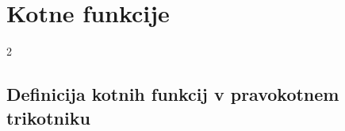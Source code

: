 \section{Kotne funkcije}

\begin{frame}
    \sectionpage
\end{frame}

\begin{frame}
    \begin{multicols}{2}
    \end{multicols}
\end{frame}

    \subsection{Definicija kotnih funkcij v pravokotnem trikotniku}

